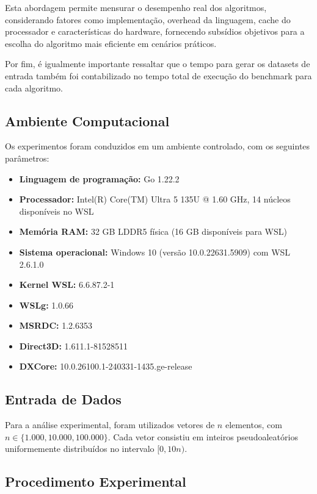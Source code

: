 \documentclass[12pt]{article}
\begin{document}
Esta abordagem permite mensurar o desempenho real dos algoritmos, considerando fatores como implementação, overhead da linguagem, cache do processador e características do hardware, fornecendo subsídios objetivos para a escolha do algoritmo mais eficiente em cenários práticos.

Por fim, é igualmente importante ressaltar que o tempo para gerar os datasets de entrada também foi contabilizado no tempo total de execução do benchmark para cada algoritmo.

\subsection{Ambiente Computacional}

Os experimentos foram conduzidos em um ambiente controlado, com os seguintes parâmetros:

\begin{itemize}
    \item \textbf{Linguagem de programação:} Go 1.22.2
    \item \textbf{Processador:} Intel(R) Core(TM) Ultra 5 135U @ 1.60 GHz, 14 núcleos disponíveis no WSL
    \item \textbf{Memória RAM:} 32 GB LDDR5 física (16 GB disponíveis para WSL)
    \item \textbf{Sistema operacional:} Windows 10 (versão 10.0.22631.5909) com WSL 2.6.1.0
    \item \textbf{Kernel WSL:} 6.6.87.2-1
    \item \textbf{WSLg:} 1.0.66
    \item \textbf{MSRDC:} 1.2.6353
    \item \textbf{Direct3D:} 1.611.1-81528511
    \item \textbf{DXCore:} 10.0.26100.1-240331-1435.ge-release
\end{itemize}

\subsection{Entrada de Dados}

Para a análise experimental, foram utilizados vetores de $n$ elementos, com $n \in \{1.000, 10.000, 100.000\}$. Cada vetor consistiu em inteiros pseudoaleatórios uniformemente distribuídos no intervalo $[0, 10n)$.

\subsection{Procedimento Experimental}
\end{document}

